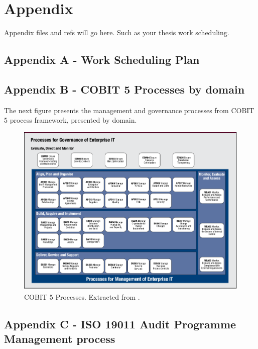 
\section{Appendix} %
\label{sec:attachments}

Appendix files and refs will go here.
Such as your thesis work scheduling. 

\subsection{Appendix A - Work Scheduling Plan} 

\vspace{10mm}

\subsection{Appendix B - COBIT 5 Processes by domain} 

The next figure presents the management and governance processes from COBIT 5 process framework, presented by domain.

\begin{figure}
\centering
\includegraphics[width=\textwidth]{img/COBIT5ProcessFramework.png}
\caption{COBIT 5 Processes. Extracted from \cite{2012cobit}.}
\end{figure}

\vspace{10mm}

\subsection{Appendix C - ISO 19011 Audit Programme Management process} 

